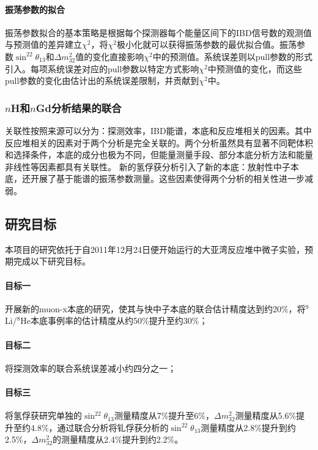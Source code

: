 \documentclass[a4paper,zihao=-4]{article}
\begin{document}
\paragraph{振荡参数的拟合}
振荡参数拟合的基本策略是根据每个探测器每个能量区间下的IBD信号数的观测值与预测值的差异建立$\chi^2$，将$\chi^2$极小化就可以获得振荡参数的最优拟合值。振荡参数$\sin^22\theta_{13}$和$\Delta m_{32}^2$值的变化直接影响$\chi^2$中的预测值。系统误差则以pull参数的形式引入。每项系统误差对应的pull参数以特定方式影响$\chi^2$中预测值的变化，而这些pull参数的变化由估计出的系统误差限制，并贡献到$\chi^2$中。

\subsubsection{$n$H和$n$Gd分析结果的联合}\label{sec:nGdnH-combine}
关联性按照来源可以分为：探测效率，IBD能谱，本底和反应堆相关的因素。其中反应堆相关的因素对于两个分析是完全关联的。两个分析虽然具有显著不同靶体积和选择条件，本底的成分也极为不同，但能量测量手段、部分本底分析方法和能量非线性等因素都具有关联性。 新的氢俘获分析引入了新的本底：放射性中子本底，还开展了基于能谱的振荡参数测量。这些因素使得两个分析的相关性进一步减弱。

\subsection{研究目标}
本项目的研究依托于自2011年12月24日便开始运行的大亚湾反应堆中微子实验，预期完成以下研究目标。

\paragraph{目标一} 开展新的muon-x本底的研究，使其与快中子本底的联合估计精度达到约20\%，将$^9$Li/$^8$He本底事例率的估计精度从约50\%提升至约30\%；
\paragraph{目标二} 将探测效率的联合系统误差减小约四分之一；
\paragraph{目标三} 将氢俘获研究单独的$\sin^22\theta_{13}$测量精度从7\%提升至6\%，$\Delta m_{32}^2$测量精度从5.6\%提升至约4.8\%，通过联合分析将钆俘获分析的$\sin^22\theta_{13}$测量精度从2.8\%提升到约2.5\%，$\Delta m_{32}^2$的测量精度从2.4\%提升到约2.2\%。
\end{document}
